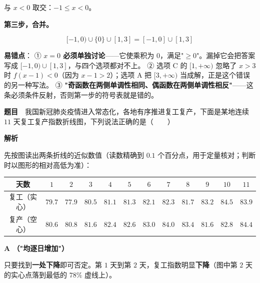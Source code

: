 与 $x<0$ 取交：$-1\le x<0$。

\textbf{第三步，合并。}

\[[-1,0)\cup\{0\}\cup[1,3]=[-1,0]\cup[1,3]\]


\begin{gktip}
\textbf{易错点}：
① \textbf{$x=0$ 必须单独讨论}——它使乘积为 $0$，满足"$\ge0$"。漏掉它会把答案写成 $[-1,0)\cup[1,3]$，与四个选项都对不上。
② 选项 C 的 $[1,+\infty)$ 忽略了 $x>3$ 时 $f(x-1)<0$（因为 $x-1>2$）；选项 A 把 $[3,+\infty)$ 当成解，正是这个错误的另一种写法。
③ \textbf{"奇函数在两侧单调性相同、偶函数在两侧单调性相反"}——这条必须条件反射，否则第一步的符号表就是错的。
\end{gktip}

\par\medskip



\textbf{题目}　我国新冠肺炎疫情进入常态化，各地有序推进复工复产，下面是某地连续 $11$ 天复工复产指数折线图，下列说法正确的是（　　）

\begin{center}\end{center}

\textbf{解析}

先按图读出两条折线的近似数值（读数精确到 $0.1$ 个百分点，用于定量核对；判断时以图形的相对高低为准）：

\begin{center}
\begingroup\setlength{\tabcolsep}{4pt}
\begin{tabular}{cccccccccccc}
\toprule
天数 & $1$ & $2$ & $3$ & $4$ & $5$ & $6$ & $7$ & $8$ & $9$ & $10$ & $11$ \\
\midrule
复工（实心） & $79.7$ & $77.9$ & $80.5$ & $81.1$ & $81.3$ & $82.1$ & $82.3$ & $81.7$ & $83.2$ & $84.5$ & $83.9$ \\
复产（空心） & $80.6$ & $80.8$ & $81.6$ & $82.4$ & $82.6$ & $83.0$ & $84.0$ & $83.4$ & $81.6$ & $82.8$ & $84.4$ \\
\bottomrule
\end{tabular}
\endgroup
\end{center}

\par\medskip

\textbf{A （"均逐日增加"）}

只要找到\textbf{一处下降}即可否定。第 $1$ 天到第 $2$ 天，复工指数明显\textbf{下降}（图中第 $2$ 天的实心点落到最低的 $78\%$ 虚线上）。

